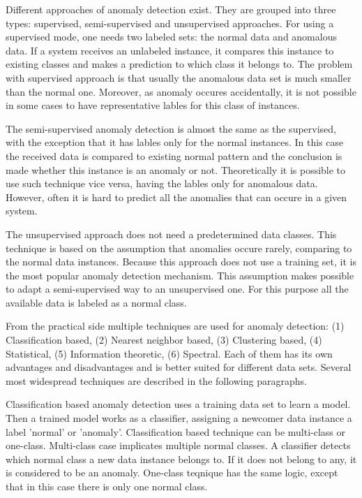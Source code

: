 Different approaches of anomaly detection exist.
They are grouped into three types: supervised, semi-supervised and unsupervised approaches.
For using a supervised mode, one needs two labeled sets: the normal data and anomalous data.
If a system receives an unlabeled instance, it compares this instance to existing classes and makes a prediction to which class it belongs to.
The problem with supervised approach is that usually the anomalous data set is much smaller than the normal one.
Moreover, as anomaly occures accidentally, it is not possible in some cases to have representative lables for this class of instances.
 
The semi-supervised anomaly detection is almost the same as the supervised, with the exception that it has lables only for the normal instances.
In this case the received data is compared to existing normal pattern and the conclusion is made whether this instance is an anomaly or not.
Theoretically it is possible to use such technique vice versa, having the lables only for anomalous data.
However, often it is hard to predict all the anomalies that can occure in a given system.

The unsupervised approach does not need a predetermined data classes.
This technique is based on the assumption that anomalies occure rarely, comparing to the normal data instances.
Because this approach does not use a training set, it is the most popular anomaly detection mechanism.
This assumption makes possible to adapt a semi-supervised way to an unsupervised one.
For this purpose all the available data is labeled as a normal class.

From the practical side multiple techniques are used for anomaly detection:
(1) Classification based, (2) Nearest neighbor based, (3) Clustering based, (4) Statistical, (5) Information theoretic, (6) Spectral.
Each of them has its own advantages and disadvantages and is better suited for different data sets.
Several most widespread techniques are described in the following paragraphs.

Classification based anomaly detection uses a training data set to learn a model.
Then a trained model works as a classifier, assigning a newcomer data instance a label 'normal' or 'anomaly'.
Classification based technique can be multi-class or one-class.
Multi-class case implicates multiple normal classes.
A classifier detects which normal class a new data instance belongs to.
If it does not belong to any, it is considered to be an anomaly.
One-class teqnique has the same logic, except that in this case there is only one normal class.

